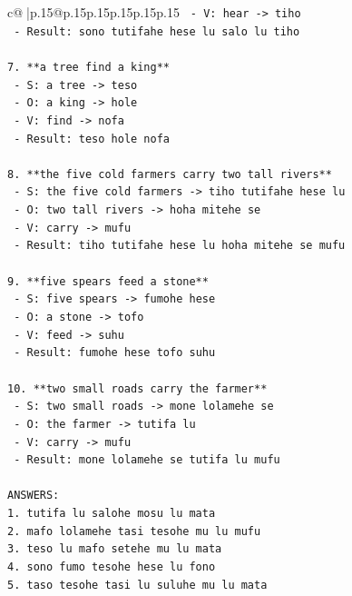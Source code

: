 \documentclass{article}
\begin{document}
{\begin{supertabular}{c@{$\;$}|p{.15\linewidth}@{}p{.15\linewidth}p{.15\linewidth}p{.15\linewidth}p{.15\linewidth}p{.15\linewidth}}
{{{\texttt{   {-} V: hear {-}> tiho} \\
\texttt{   {-} Result: sono tutifahe hese lu salo lu tiho} \\
\\ 
\texttt{7. **a tree find a king**} \\
\texttt{   {-} S: a tree {-}> teso} \\
\texttt{   {-} O: a king {-}> hole} \\
\texttt{   {-} V: find {-}> nofa} \\
\texttt{   {-} Result: teso hole nofa} \\
\\ 
\texttt{8. **the five cold farmers carry two tall rivers**} \\
\texttt{   {-} S: the five cold farmers {-}> tiho tutifahe hese lu} \\
\texttt{   {-} O: two tall rivers {-}> hoha mitehe se} \\
\texttt{   {-} V: carry {-}> mufu} \\
\texttt{   {-} Result: tiho tutifahe hese lu hoha mitehe se mufu} \\
\\ 
\texttt{9. **five spears feed a stone**} \\
\texttt{   {-} S: five spears {-}> fumohe hese} \\
\texttt{   {-} O: a stone {-}> tofo} \\
\texttt{   {-} V: feed {-}> suhu} \\
\texttt{   {-} Result: fumohe hese tofo suhu} \\
\\ 
\texttt{10. **two small roads carry the farmer**} \\
\texttt{    {-} S: two small roads {-}> mone lolamehe se} \\
\texttt{    {-} O: the farmer {-}> tutifa lu} \\
\texttt{    {-} V: carry {-}> mufu} \\
\texttt{    {-} Result: mone lolamehe se tutifa lu mufu} \\
\\ 
\texttt{ANSWERS:} \\
\texttt{1. tutifa lu salohe mosu lu mata} \\
\texttt{2. mafo lolamehe tasi tesohe mu lu mufu} \\
\texttt{3. teso lu mafo setehe mu lu mata} \\
\texttt{4. sono fumo tesohe hese lu fono} \\
\texttt{5. taso tesohe tasi lu suluhe mu lu mata} \\
}}}
\end{supertabular}}
\end{document}
